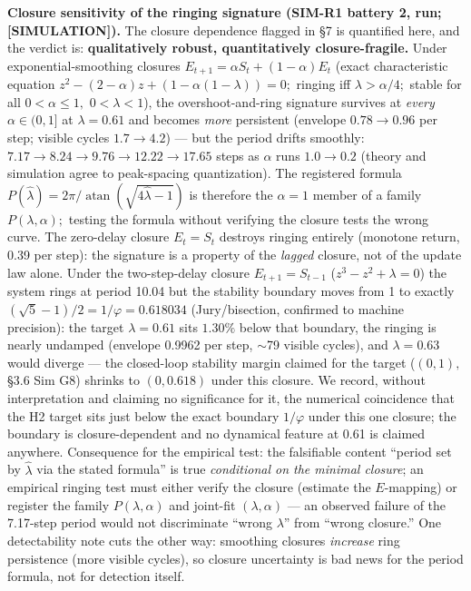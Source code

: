 \documentclass[
]{article}
\begin{document}
\textbf{Closure sensitivity of the ringing signature (SIM-R1 battery 2,
run; {[}SIMULATION{]}).} The closure dependence flagged in §7 is
quantified here, and the verdict is: \textbf{qualitatively robust,
quantitatively closure-fragile.} Under exponential-smoothing closures
\(E_{t+1} = \alpha S_t + (1-\alpha)E_t\) (exact characteristic equation
\(z^{2} - (2-\alpha)z + (1 - \alpha(1-\lambda)) = 0;\) ringing iff
\(\lambda > \alpha/4;\) stable for all \(0 < \alpha \leq 1,\)
\(0 < \lambda < 1\)), the overshoot-and-ring signature survives at
\emph{every} \(\alpha \in (0, 1]\) at \(\lambda = 0.61\) and becomes
\emph{more} persistent (envelope \(0.78 \to 0.96\) per step; visible
cycles \(1.7 \to 4.2\)) --- but the period drifts smoothly:
\(7.17 \to 8.24 \to 9.76 \to 12.22 \to 17.65\) steps as \(\alpha\) runs
\(1.0 \to 0.2\) (theory and simulation agree to peak-spacing
quantization). The registered formula
\(P(\hat{\lambda}) = 2\pi/\mathop{\mathrm{atan}}(\sqrt{4\hat{\lambda}-1})\)
is therefore the \(\alpha = 1\) member of a family
\(P(\lambda, \alpha);\) testing the formula without verifying the
closure tests the wrong curve. The zero-delay closure \(E_t = S_t\)
destroys ringing entirely (monotone return, 0.39 per step): the
signature is a property of the \emph{lagged} closure, not of the update
law alone. Under the two-step-delay closure \(E_{t+1} = S_{t-1}\)
(\(z^{3} - z^{2} + \lambda = 0\)) the system rings at period 10.04 but
the stability boundary moves from 1 to exactly
\((\sqrt{5}-1)/2 = 1/\varphi = 0.618034\) (Jury/bisection, confirmed to
machine precision): the target \(\lambda = 0.61\) sits \(1.30\%\) below
that boundary, the ringing is nearly undamped (envelope 0.9962 per step,
\(\sim\)79 visible cycles), and \(\lambda = 0.63\) would diverge --- the
closed-loop stability margin claimed for the target (\((0,1),\) §3.6 Sim
G8) shrinks to \((0, 0.618)\) under this closure. We record, without
interpretation and claiming no significance for it, the numerical
coincidence that the H2 target sits just below the exact boundary
\(1/\varphi\) under this one closure; the boundary is closure-dependent
and no dynamical feature at 0.61 is claimed anywhere. Consequence for
the empirical test: the falsifiable content ``period set by
\(\hat{\lambda}\) via the stated formula'' is true \emph{conditional on
the minimal closure}; an empirical ringing test must either verify the
closure (estimate the \(E\)-mapping) or register the family
\(P(\lambda, \alpha)\) and joint-fit \((\lambda, \alpha)\) --- an
observed failure of the 7.17-step period would not discriminate ``wrong
\(\lambda\)'' from ``wrong closure.'' One detectability note cuts the
other way: smoothing closures \emph{increase} ring persistence (more
visible cycles), so closure uncertainty is bad news for the period
formula, not for detection itself.
\end{document}

